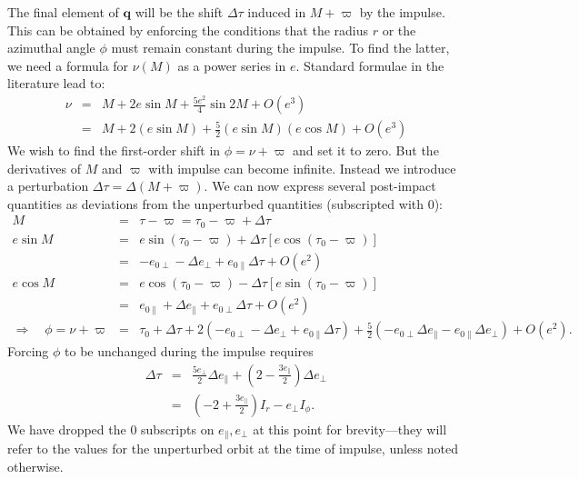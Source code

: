\documentclass[linenumbers, onecolumn]{aastex631}
\newcommand{\vecq}{\mathbf{q}}
\newcommand{\lop}{\varpi}
\begin{document}
The final element of $\vecq$ will be the shift $\Delta\tau$ induced in
$M+\lop$ by the impulse.  This can be obtained by enforcing the
conditions that the radius $r$ or the azimuthal angle $\phi$ must
remain constant during the impulse.  To find the latter, we need a formula for $\nu(M)$ as a power series in $e.$  Standard formulae in the literature lead to:
\begin{eqnarray}
  \nu & = & M + 2e \sin M + \frac{5e^2}{4} \sin 2M + O(e^3) \\
  \label{eq:nue2}
    & = & M + 2(e\sin M) + \frac{5}{2} (e \sin M) (e \cos M) + O(e^3) 
\end{eqnarray}
We wish to find the first-order shift in $\phi=\nu + \lop$ and set it
to zero.  But the derivatives of $M$ and $\lop$ with impulse can become infinite.  Instead we introduce a perturbation $\Delta\tau = \Delta(M+\lop).$ We can now express several post-impact quantities as deviations from the unperturbed quantities (subscripted with 0):
\begin{eqnarray}
  M & = & \tau-\lop = \tau_0 -\lop + \Delta\tau \\
  e \sin M & = & e \sin (\tau_0 -\lop) + \Delta\tau \left[ e \cos  (\tau_0 -\lop)\right] \nonumber \\
\label{eq:esinM}
    & = & -e_{0\perp}-\Delta e_\perp + e_{0\parallel} \Delta\tau +O(e^2) \\
  e \cos M & = & e \cos (\tau_0 -\lop) - \Delta\tau \left[ e \sin  (\tau_0 -\lop)\right] \nonumber\\
\label{eq:ecosM}
    & = & e_{0\parallel}+\Delta e_\parallel + e_{0\perp} \Delta\tau +O(e^2) \\
\Rightarrow \quad \phi =\nu+\lop & = & \tau_0 + \Delta \tau + 2( -e_{0\perp}-\Delta e_\perp + e_{0\parallel} \Delta\tau )
                              + \frac{5}{2}\left( -e_{0\perp}\Delta e_\parallel-e_{0\parallel}\Delta e_\perp\right) + O(e^2).
\label{eq:phi}
\end{eqnarray}
Forcing $\phi$ to be unchanged during the impulse requires
\begin{eqnarray}
  \Delta\tau & = & \frac{5 e_\perp}{2} \Delta e_\parallel + \left(2-\frac{3e_\parallel}{2}\right) \Delta e_\perp \\
             & = & \left(-2+\frac{3e_\parallel}{2}\right) I_r - e_\perp I_\phi.
                   \label{eq:dtau0}
\end{eqnarray}
We have dropped the 0 subscripts on $e_\parallel,e_\perp$ at this point for brevity---they will refer to the values for the unperturbed orbit at the time of impulse, unless noted otherwise.
\end{document}

